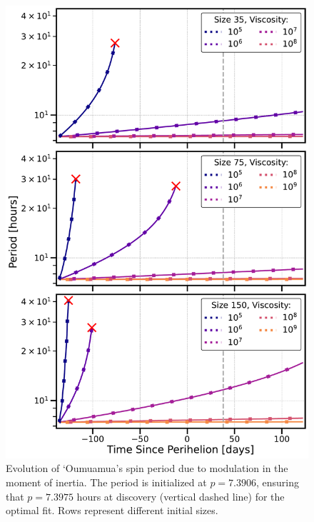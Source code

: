 \documentclass[twocolumn,doublespacing]{aastex631}
\begin{document}
\begin{figure}
\centering
\includegraphics[width=\linewidth,angle=0]{optimal_axis_periods.pdf}
\caption{Evolution of `Oumuamua's spin period due to modulation in the moment of inertia. The period is initialized at $p=7.3906$, ensuring that $p=7.3975$ hours at discovery (vertical dashed line) for the optimal fit. Rows represent different initial sizes. }
\label{fig:optimalaxisperiods}
\end{figure}
\end{document}

